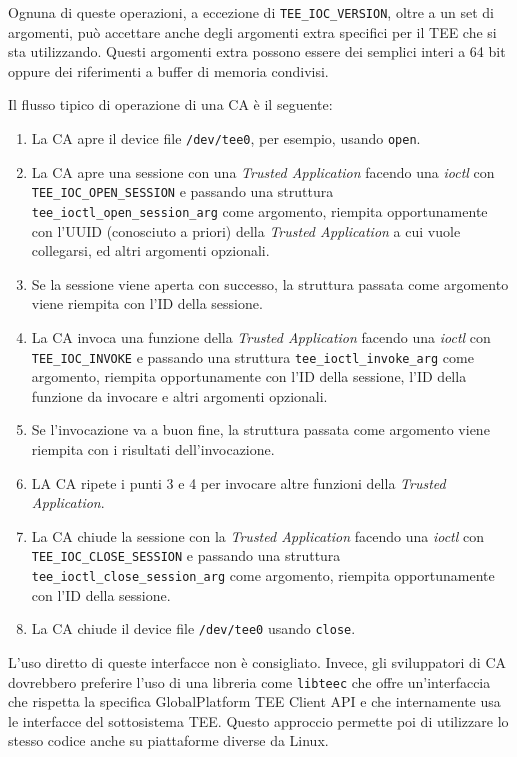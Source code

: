 \documentclass[12pt,italian]{report}
\begin{document}
Ognuna di queste operazioni, a eccezione di \texttt{TEE\_IOC\_VERSION},
oltre a un set di argomenti, può accettare anche degli argomenti extra
specifici per il TEE che si sta utilizzando.
Questi argomenti extra possono essere dei semplici interi a 64 bit oppure
dei riferimenti a buffer di memoria condivisi.

Il flusso tipico di operazione di una CA è il seguente:
\begin{enumerate}
    \item La CA apre il device file \texttt{/dev/tee0}, per esempio, usando
        \texttt{open}.
    \item La CA apre una sessione con una \textit{Trusted Application}
        facendo una \textit{ioctl} con \texttt{TEE\_IOC\_OPEN\_SESSION}
        e passando una struttura \texttt{tee\_ioctl\_open\_session\_arg}
        come argomento, riempita opportunamente con l'UUID
        (conosciuto a priori) 
        della \textit{Trusted Application} a cui vuole collegarsi, 
        ed altri argomenti opzionali.
    \item Se la sessione viene aperta con successo, la struttura passata come
        argomento viene riempita con l'ID della sessione.
    \item La CA invoca una funzione della \textit{Trusted Application} facendo
        una \textit{ioctl} con \texttt{TEE\_IOC\_INVOKE} e passando una
        struttura \texttt{tee\_ioctl\_invoke\_arg} come argomento, riempita
        opportunamente con l'ID della sessione, l'ID della funzione da
        invocare e altri argomenti opzionali.
    \item Se l'invocazione va a buon fine, la struttura passata come argomento
        viene riempita con i risultati dell'invocazione.
    \item LA CA ripete i punti 3 e 4 per invocare altre funzioni della
        \textit{Trusted Application}.
    \item La CA chiude la sessione con la \textit{Trusted Application} facendo
        una \textit{ioctl} con \texttt{TEE\_IOC\_CLOSE\_SESSION} e passando
        una struttura \texttt{tee\_ioctl\_close\_session\_arg} come argomento,
        riempita opportunamente con l'ID della sessione.
    \item La CA chiude il device file \texttt{/dev/tee0} usando \texttt{close}.
\end{enumerate}

\bigbreak \noindent

L'uso diretto di queste interfacce non è consigliato.
Invece, gli sviluppatori di CA dovrebbero preferire l'uso di una libreria come
\texttt{libteec} che offre un'interfaccia che rispetta la specifica
GlobalPlatform TEE Client API\cite{gp2020internalapi} 
e che internamente usa
le interfacce del sottosistema TEE.
Questo approccio permette poi di utilizzare lo stesso codice anche su
piattaforme diverse da Linux.
\end{document}
